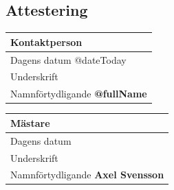 \documentclass{article}
\begin{document}
\subsection*{Attestering}
\hspace{-0.1in}
\begin{tabular}{|p{3.0in}|}
    \multicolumn{1}{l}{Kontaktperson}\vspace{0.03in} \\
    \hline
    {\footnotesize Dagens datum} \newline @dateToday \\
    \hline
    {\footnotesize Underskrift} \newline \newline\\
    \hline
    {\footnotesize Namnförtydligande} \newline \textbf{@fullName} \\
    \hline
\end{tabular}
\hspace{0.3in}
\begin{tabular}{|p{3.0in}|}
    \multicolumn{1}{l}{Mästare}\vspace{0.03in} \\
    \hline
    {\footnotesize Dagens datum} \newline \\
    \hline
    {\footnotesize Underskrift} \newline \newline\\
    \hline
    {\footnotesize Namnförtydligande} \newline \textbf{Axel Svensson} \\
    \hline
\end{tabular}

\end{document}
